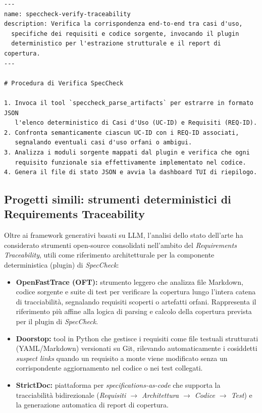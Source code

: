 \documentclass[a4paper, 11pt]{article}
\begin{document}
\begin{lstlisting}[caption={Schema esemplificativo di una Skill di verifica per OpenCode}]
---
name: speccheck-verify-traceability
description: Verifica la corrispondenza end-to-end tra casi d'uso,
  specifiche dei requisiti e codice sorgente, invocando il plugin
  deterministico per l'estrazione strutturale e il report di copertura.
---

# Procedura di Verifica SpecCheck

1. Invoca il tool `speccheck_parse_artifacts` per estrarre in formato JSON
   l'elenco deterministico di Casi d'Uso (UC-ID) e Requisiti (REQ-ID).
2. Confronta semanticamente ciascun UC-ID con i REQ-ID associati,
   segnalando eventuali casi d'uso orfani o ambigui.
3. Analizza i moduli sorgente mappati dal plugin e verifica che ogni
   requisito funzionale sia effettivamente implementato nel codice.
4. Genera il file di stato JSON e avvia la dashboard TUI di riepilogo.
\end{lstlisting}

\subsection{Progetti simili: strumenti deterministici di Requirements Traceability}
Oltre ai framework generativi basati su LLM, l'analisi dello stato dell'arte ha considerato strumenti open-source consolidati nell'ambito del \textit{Requirements Traceability}, utili come riferimento architetturale per la componente deterministica (plugin) di \textit{SpecCheck}:
\begin{itemize}[noitemsep]
    \item \textbf{OpenFastTrace (OFT):} strumento leggero che analizza file Markdown, codice sorgente e suite di test per verificare la copertura lungo l'intera catena di tracciabilità, segnalando requisiti scoperti o artefatti orfani. Rappresenta il riferimento più affine alla logica di parsing e calcolo della copertura prevista per il plugin di \textit{SpecCheck}.
    \item \textbf{Doorstop:} tool in Python che gestisce i requisiti come file testuali strutturati (YAML/Markdown) versionati su Git, rilevando automaticamente i cosiddetti \textit{suspect links} quando un requisito a monte viene modificato senza un corrispondente aggiornamento nel codice o nei test collegati.
    \item \textbf{StrictDoc:} piattaforma per \textit{specifications-as-code} che supporta la tracciabilità bidirezionale (\textit{Requisiti $\rightarrow$ Architettura $\rightarrow$ Codice $\rightarrow$ Test}) e la generazione automatica di report di copertura.
\end{itemize}
\end{document}
